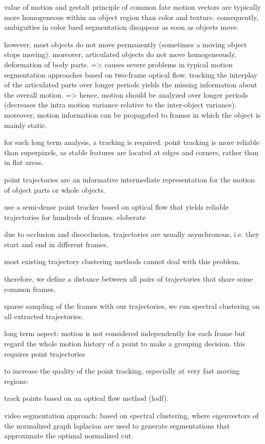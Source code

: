 value of motion and gestalt principle of common fate
motion vectors are typically more homogeneous within an object region than color and texture. consequently, ambiguities in color baed segmentation disappear as soon as objects move.

however, most objects do not move permanently (sometimes a moving object stops moving). moreover, articulated objects do not move homogeneously. deformation of body parts.
=> causes severe problems in typical motion segmentation approaches based on two-frame optical flow.
tracking the interplay of the articulated parts over longer periods yields the missing information about the overall motion.
=> hence, motion should be analyzed over longer periods (decreases the intra motion variance relative to the inter-object variance). moreover, motion information can be propagated to frames in which the object is mainly static.

for such long term analysis, a tracking is required.
point tracking is more reliable than superpixels, as stable features are located at edges and corners, rather than in flat areas.

point trajectories are an informative intermediate representation for the motion of object parts or whole objects.

use a semi-dense point tracker based on optical flow that yields reliable trajectories for hundreds of frames.
eloberate

due to occlusion and disocclusion, 
trajectories are usually asynchronous, i.e. they start and end in different frames. 

most existing trajectory clustering methods cannot deal with this problem. 

therefore, we define a distance between all pairs of trajectories that share some common frames.

sparse sampling of the frames with our trajectories, 
we run spectral clustering on all extracted trajectories.


long term aspect: motion is not considered independently for each frame but regard the whole motion history of a point to make a grouping decision.
this requires point trajectories

to increase the quality of the point tracking, especially at very fast moving regions: 

track points based on an optical flow method (lodf). 

video segmentation approach: based on spectral clustering, where eigenvectors of the normalized graph laplacian are used to generate segmentations that approximate the optimal normalized cut.


